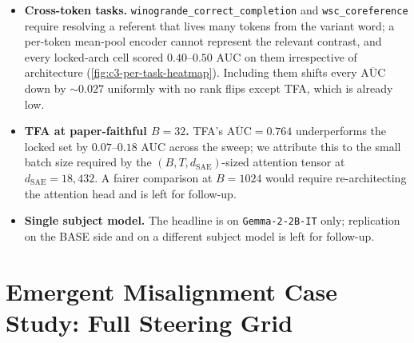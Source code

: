 \begin{itemize}
    \item \textbf{Cross-token tasks.} \texttt{winogrande\_correct\_completion} and \texttt{wsc\_coreference} require resolving a referent that lives many tokens from the variant word; a per-token mean-pool encoder cannot represent the relevant contrast, and every locked-arch cell scored $0.40$--$0.50$ AUC on them irrespective of architecture (\cref{fig:c3-per-task-heatmap}). Including them shifts every $\overline{\mathrm{AUC}}$ down by $\sim\!0.027$ uniformly with no rank flips except TFA, which is already low.
    \item \textbf{TFA at paper-faithful $B=32$.} TFA's $\overline{\mathrm{AUC}} = 0.764$ underperforms the locked set by $0.07$--$0.18$ AUC across the sweep; we attribute this to the small batch size required by the $(B, T, d_{\mathrm{SAE}})$-sized attention tensor at $d_{\mathrm{SAE}} = 18{,}432$. A fairer comparison at $B = 1024$ would require re-architecting the attention head and is left for follow-up.
    \item \textbf{Single subject model.} The headline is on \texttt{Gemma-2-2B-IT} only; replication on the BASE side and on a different subject model is left for follow-up.
\end{itemize}

\section{Emergent Misalignment Case Study: Full Steering Grid}
\label{app:c6}

